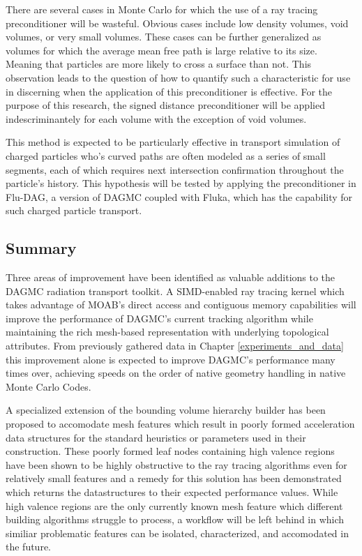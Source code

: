 \documentclass[12pt, a4paper]{article}
\begin{document}
There are several cases in Monte Carlo for which the use of a ray tracing preconditioner will be wasteful. Obvious cases include low density volumes, void volumes, or very small volumes. These cases can be further generalized as volumes for which the average mean free path is large relative to its size. Meaning that particles are more likely to cross a surface than not. This observation leads to the question of how to quantify such a characteristic for use in discerning when the application of this preconditioner is effective. For the purpose of this research, the signed distance preconditioner will be applied indescriminantely for each volume with the exception of void volumes.

This method is expected to be particularly effective in transport simulation of charged particles who's curved paths are often modeled as a series of small segments, each of which requires next intersection confirmation throughout the particle's history. This hypothesis will be tested by applying the preconditioner in Flu-DAG, a version of DAGMC coupled with Fluka\cite{Bohlen_2014}, which has the capability for such charged particle transport.


\subsection{Summary}

Three areas of improvement have been identified as valuable additions to the DAGMC radiation transport toolkit. A SIMD-enabled ray tracing kernel which takes advantage of MOAB's direct access and contiguous memory capabilities will improve the performance of DAGMC's current tracking algorithm while maintaining the rich mesh-based representation with underlying topological attributes. From previously gathered data in Chapter \ref{experiments_and_data} this improvement alone is expected to improve DAGMC's performance many times over, achieving speeds on the order of native geometry handling in native Monte Carlo Codes.

A specialized extension of the bounding volume hierarchy builder has been proposed to accomodate mesh features which result in poorly formed acceleration data structures for the standard heuristics or parameters used in their construction. These poorly formed leaf nodes containing high valence regions have been shown to be highly obstructive to the ray tracing algorithms even for relatively small features and a remedy for this solution has been demonstrated which returns the datastructures to their expected performance values. While high valence regions are the only currently known mesh feature which different building algorithms struggle to process, a workflow will be left behind in which similiar problematic features can be isolated, characterized, and accomodated in the future.
\end{document}
